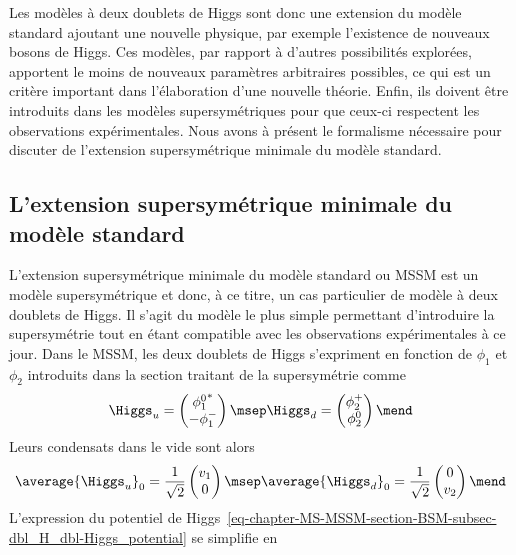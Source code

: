 \par Les modèles à deux doublets de Higgs sont donc une extension du modèle standard ajoutant une nouvelle physique, par exemple l'existence de nouveaux bosons de Higgs.
Ces modèles, par rapport à d'autres possibilités explorées, apportent le moins de nouveaux paramètres arbitraires possibles, ce qui est un critère important dans l'élaboration d'une nouvelle théorie.
Enfin, ils doivent être introduits dans les modèles supersymétriques pour que ceux-ci respectent les observations expérimentales.
Nous avons à présent le formalisme nécessaire pour discuter de l'extension supersymétrique minimale du modèle standard.
\subsection{L'extension supersymétrique minimale du modèle standard}\label{chapter-MS-MSSM-section-BSM-subsec-MSSM}
L'extension supersymétrique minimale du modèle standard ou MSSM
est un modèle supersymétrique et donc, à ce titre, un cas particulier de modèle à deux doublets de Higgs.
Il s'agit du modèle le plus simple permettant d'introduire la supersymétrie tout en étant compatible avec les observations expérimentales à ce jour.
Dans le MSSM, les deux doublets de Higgs s'expriment en fonction de $\phi_1$ et $\phi_2$ introduits dans la section traitant de la supersymétrie comme
\begin{equation}
\Higgs_u
=
\begin{pmatrix}
{\phi_1^0}^* \\ -\phi_1^-
\end{pmatrix}
\msep
\Higgs_d
=
\begin{pmatrix}
\phi_2^+ \\ \phi_2^0
\end{pmatrix}
\mend
\label{eq-chapter-MS-MSSM-section-BSM-Higgs_doublets}
\end{equation}
Leurs condensats dans le vide sont alors
\begin{equation}
\average{\Higgs_u}_0 = \frac{1}{\sqrt{2}} \begin{pmatrix}v_1 \\ 0 \end{pmatrix}
\msep
\average{\Higgs_d}_0 = \frac{1}{\sqrt{2}} \begin{pmatrix} 0\\ v_2 \end{pmatrix}
\mend
\end{equation}
L'expression du potentiel de Higgs~\eqref{eq-chapter-MS-MSSM-section-BSM-subsec-dbl_H_dbl-Higgs_potential} se simplifie en
